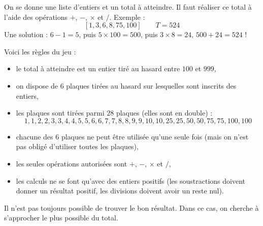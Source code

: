 \documentclass[11pt,class=report,crop=false]{standalone}
\begin{document}
\begin{cours}
On se donne une liste d'entiers et un total à atteindre. Il faut réaliser ce total à l'aide des opérations \og{}$+$\fg{}, \og{}$-$\fg{}, \og{}$\times$\fg{} et \og{}$/$\fg{}.
Exemple :
$$[1, 3, 6, 8, 75, 100]  \qquad T=524$$
Une solution : $6-1=5$, puis $5 \times 100 = 500$, puis $3\times 8 = 24$, $500+24 = 524$ !

Voici les règles du jeu :
\begin{itemize}
  \item le total à atteindre est un entier tiré au hasard entre $100$ et $999$,
  
  \item on dispose de $6$ plaques tirées au hasard sur lesquelles sont inscrits des entiers,
  
  \item les plaques sont tirées parmi $28$ plaques (elles sont en double) :
  $$1,1,2,2,3,3,4,4,5,5,6,6,7,7,8,8,9,9,10,10,25,25,50,50,75,75,100,100$$
   
  \item chacune des $6$ plaques ne peut être utilisée qu'une seule fois (mais on n'est pas obligé d'utiliser toutes les plaques),
  
  \item les seules opérations autorisées sont \og{}$+$\fg{}, \og{}$-$\fg{}, \og{}$\times$\fg{} et \og{}$/$\fg{},
  
  \item les calculs ne se font qu'avec des entiers positifs (les soustractions doivent donner un résultat positif, les divisions doivent avoir un reste nul). 
\end{itemize}

Il n'est pas toujours possible de trouver le bon résultat. Dans ce cas, on cherche à s'approcher le plus possible du total.

\end{cours}



\end{document}
